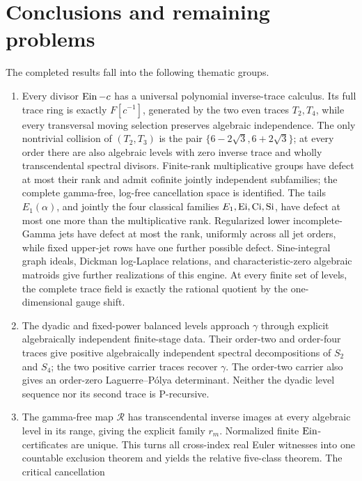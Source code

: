 \section{Conclusions and remaining problems}
\label{sec:conclusion}

The completed results fall into the following thematic groups.
\begin{enumerate}[label=\textup{(\arabic*)}]
 \item Every divisor \(\operatorname{Ein}-c\) has a universal polynomial inverse-trace
 calculus.  Its full trace ring is exactly \(F[c^{-1}]\), generated by the
 two even traces \(T_2,T_4\), while every transversal moving selection
 preserves algebraic independence.  The only nontrivial collision of
 \((T_2,T_3)\) is the pair \(\{6-2\sqrt3,6+2\sqrt3\}\); at every order
 there are also algebraic levels with zero inverse trace and wholly
 transcendental spectral divisors.  Finite-rank multiplicative groups have
 defect at most their rank and admit cofinite jointly independent
 subfamilies; the complete gamma-free, log-free cancellation space is
 identified.  The tails \(E_1(\alpha)\), and jointly the four classical
 families \(E_1,\operatorname{Ei},\operatorname{Ci},\operatorname{Si}\), have defect at most one more
 than the multiplicative rank.  Regularized lower incomplete-Gamma jets
 have defect at most the rank, uniformly across all jet orders, while fixed
 upper-jet rows have one further possible defect.  Sine-integral graph
 ideals, Dickman log-Laplace relations, and characteristic-zero algebraic
 matroids give further realizations of this engine.  At every finite set of
 levels, the complete trace field is exactly the rational quotient by the
 one-dimensional gauge shift.
 \item The dyadic and fixed-power balanced levels approach \(\gamma\) through
 explicit algebraically independent finite-stage data.  Their order-two
 and order-four traces give positive algebraically independent spectral
 decompositions of \(S_2\) and \(S_4\); the two positive carrier traces
 recover \(\gamma\).  The order-two carrier also gives an order-zero
 Laguerre--P\'olya determinant.  Neither the dyadic level sequence nor its
 second trace is P-recursive.
 \item The gamma-free map \(\mathscr R\) has transcendental inverse images at
 every algebraic level in its range, giving the explicit family \(r_m\).
 Normalized finite \(\operatorname{Ein}\)-certificates are unique.  This turns all
 cross-index real Euler witnesses into one countable exclusion theorem and
 yields the relative five-class theorem.  The critical cancellation

\end{enumerate}
